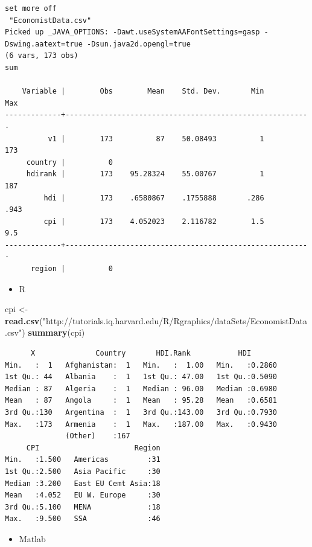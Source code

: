 \documentclass[]{book}
\newenvironment{Shaded}{\begin{snugshade}}{\end{snugshade}}
\newcommand{\KeywordTok}[1]{\textcolor[rgb]{0.13,0.29,0.53}{\textbf{#1}}}
\newcommand{\StringTok}[1]{\textcolor[rgb]{0.31,0.60,0.02}{#1}}
\newcommand{\NormalTok}[1]{#1}
\providecommand{\tightlist}{%
  \setlength{\itemsep}{0pt}\setlength{\parskip}{0pt}}
\begin{document}
\begin{verbatim}
set more off
 "EconomistData.csv"
Picked up _JAVA_OPTIONS: -Dawt.useSystemAAFontSettings=gasp -Dswing.aatext=true -Dsun.java2d.opengl=true
(6 vars, 173 obs)
sum

    Variable |        Obs        Mean    Std. Dev.       Min        Max
-------------+---------------------------------------------------------
          v1 |        173          87    50.08493          1        173
     country |          0
     hdirank |        173    95.28324    55.00767          1        187
         hdi |        173    .6580867    .1755888       .286       .943
         cpi |        173    4.052023    2.116782        1.5        9.5
-------------+---------------------------------------------------------
      region |          0
\end{verbatim}

\begin{itemize}
\tightlist
\item
  R
\end{itemize}

\begin{Shaded}
\begin{Highlighting}[]
\NormalTok{cpi <-}\StringTok{ }\KeywordTok{read.csv}\NormalTok{(}\StringTok{"http://tutorials.iq.harvard.edu/R/Rgraphics/dataSets/EconomistData.csv"}\NormalTok{)}
\KeywordTok{summary}\NormalTok{(cpi)}
\end{Highlighting}
\end{Shaded}

\begin{verbatim}
      X              Country       HDI.Rank           HDI        
Min.   :  1   Afghanistan:  1   Min.   :  1.00   Min.   :0.2860  
1st Qu.: 44   Albania    :  1   1st Qu.: 47.00   1st Qu.:0.5090  
Median : 87   Algeria    :  1   Median : 96.00   Median :0.6980  
Mean   : 87   Angola     :  1   Mean   : 95.28   Mean   :0.6581  
3rd Qu.:130   Argentina  :  1   3rd Qu.:143.00   3rd Qu.:0.7930  
Max.   :173   Armenia    :  1   Max.   :187.00   Max.   :0.9430  
              (Other)    :167                                    
     CPI                      Region  
Min.   :1.500   Americas         :31  
1st Qu.:2.500   Asia Pacific     :30  
Median :3.200   East EU Cemt Asia:18  
Mean   :4.052   EU W. Europe     :30  
3rd Qu.:5.100   MENA             :18  
Max.   :9.500   SSA              :46
\end{verbatim}

\begin{itemize}
\tightlist
\item
  Matlab
\end{itemize}
\end{document}
